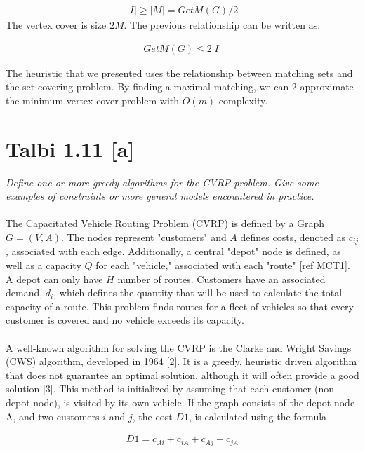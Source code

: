 \documentclass[12pt]{article}
\begin{document}
\begin{align*}
|I|  \geq |M| = GetM(G) / 2
\end{align*}
The vertex cover is size $2M$. The previous relationship can be written as:

\begin{align*}
GetM(G) \leq 2 |I|
\end{align*}

The heuristic that we presented uses the relationship between matching sets and the set covering problem. By finding a maximal matching, we can 2-approximate the minimum vertex cover problem with $O(m)$ complexity.



\section{Talbi 1.11 [a]}

\textit{Define one or more greedy algorithms for the CVRP problem. Give some examples of constraints or more general models encountered in practice.}
\paragraph{}
The Capacitated Vehicle Routing Problem (CVRP) is defined by a Graph $G = (V, A)$. The nodes represent "customers" and $A$ defines costs, denoted as $c_{ij}$, associated with each edge. Additionally, a central "depot" node is defined, as well as a capacity $Q$ for each "vehicle," associated with each "route" [ref MCT1]. A depot can only have $H$ number of routes. Customers have an associated demand, $d_i$, which defines the quantity that will be used to calculate the total capacity of a route. This problem finds routes for a fleet of vehicles so that every customer is covered and no vehicle exceeds its capacity.
\paragraph{}
A well-known algorithm for solving the CVRP is the Clarke and Wright Savings (CWS) algorithm, developed in 1964 [2]. It is a greedy, heuristic driven algorithm that does not guarantee an optimal solution, although it will often provide a good solution [3]. This method is initialized by assuming that each customer (non-depot node), is visited by its own vehicle. If the graph consists of the depot node A, and two customers $i$ and $j$, the cost $D1$, is calculated using the formula

\begin{align*}
D1 = c_{Ai} + c_{iA} + c_{Aj} + c_{jA}
\end{align*}
\end{document}
